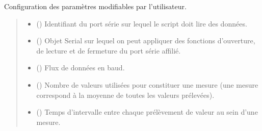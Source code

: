 \documentclass[letterpaper,10pt,french]{sphinxmanual}
\begin{document}

\begin{fulllineitems}
\label{\detokenize{library:lib_pH.fn_settings}}
\pysigstartsignatures
\pysiglinewithargsret
{}
{\sphinxparamcomma {}\sphinxparamcomma {}\sphinxparamcomma {}\sphinxparamcomma {}}
{}
\pysigstopsignatures
\sphinxAtStartPar
Configuration des paramètres modifiables par l’utilisateur.
\begin{quote}\begin{description}
\begin{itemize}
\item {} 
\sphinxAtStartPar
{} () \textendash{} Identifiant du port série sur lequel le script doit lire des données.

\item {} 
\sphinxAtStartPar
{} () \textendash{} Objet Serial sur lequel on peut appliquer des fonctions d’ouverture, de lecture et de fermeture du port série affilié.

\item {} 
\sphinxAtStartPar
{} () \textendash{} Flux de données en baud.

\item {} 
\sphinxAtStartPar
{} () \textendash{} Nombre de valeurs utilisées pour constituer une mesure (une mesure correspond à la moyenne de toutes les valeurs prélevées).

\item {} 
\sphinxAtStartPar
{} () \textendash{} Temps d’intervalle entre chaque prélèvement de valeur au sein d’une mesure.

\end{itemize}


\end{description}
\end{quote}
\end{fulllineitems}
\end{document}
